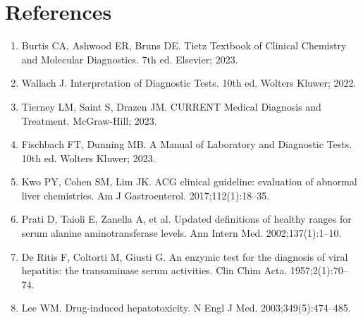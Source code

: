 \section*{References}
\begin{enumerate}
  \item Burtis CA, Ashwood ER, Bruns DE. Tietz Textbook of Clinical Chemistry and Molecular Diagnostics. 7th ed. Elsevier; 2023.
  \item Wallach J. Interpretation of Diagnostic Tests. 10th ed. Wolters Kluwer; 2022.
  \item Tierney LM, Saint S, Drazen JM. CURRENT Medical Diagnosis and Treatment. McGraw-Hill; 2023.
  \item Fischbach FT, Dunning MB. A Manual of Laboratory and Diagnostic Tests. 10th ed. Wolters Kluwer; 2023.
  \item Kwo PY, Cohen SM, Lim JK. ACG clinical guideline: evaluation of abnormal liver chemistries. Am J Gastroenterol. 2017;112(1):18--35.
  \item Prati D, Taioli E, Zanella A, et al. Updated definitions of healthy ranges for serum alanine aminotransferase levels. Ann Intern Med. 2002;137(1):1--10.
  \item De Ritis F, Coltorti M, Giusti G. An enzymic test for the diagnosis of viral hepatitis: the transaminase serum activities. Clin Chim Acta. 1957;2(1):70--74.
  \item Lee WM. Drug-induced hepatotoxicity. N Engl J Med. 2003;349(5):474--485.
\end{enumerate}

\clearpage
